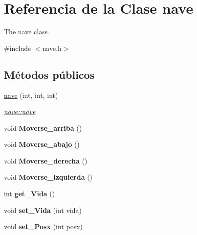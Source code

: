 \hypertarget{classnave}{\section{Referencia de la Clase nave}
\label{classnave}
}


The nave class.  




{\ttfamily \#include $<$nave.\+h$>$}

\subsection*{Métodos públicos}
\begin{DoxyCompactItemize}
\item 
\hyperlink{classnave_a8bacfc8f9a6084056d4225f019fec189}{nave} (int, int, int)
\begin{DoxyCompactList}\small\item\em \hyperlink{classnave_a8bacfc8f9a6084056d4225f019fec189}{nave\+::nave} \end{DoxyCompactList}\item 
\hypertarget{classnave_ab18b97fbf7a2754ef96f1dd2034fb3c3}{void {\bfseries Moverse\+\_\+arriba} ()}\label{classnave_ab18b97fbf7a2754ef96f1dd2034fb3c3}

\item 
\hypertarget{classnave_a20edce5f2a8c2ec2c20b5c9716c2106d}{void {\bfseries Moverse\+\_\+abajo} ()}\label{classnave_a20edce5f2a8c2ec2c20b5c9716c2106d}

\item 
\hypertarget{classnave_a8f3d73632fc16266855fd2cab2abd90e}{void {\bfseries Moverse\+\_\+derecha} ()}\label{classnave_a8f3d73632fc16266855fd2cab2abd90e}

\item 
\hypertarget{classnave_a2dcef95d2e45022b909466e53d8e7f23}{void {\bfseries Moverse\+\_\+izquierda} ()}\label{classnave_a2dcef95d2e45022b909466e53d8e7f23}

\item 
\hypertarget{classnave_a3243800568f85fc75ef3f82f35c52d44}{int {\bfseries get\+\_\+\+Vida} ()}\label{classnave_a3243800568f85fc75ef3f82f35c52d44}

\item 
\hypertarget{classnave_a6cae4804c09d2c101bf412bc290f61f7}{void {\bfseries set\+\_\+\+Vida} (int vida)}\label{classnave_a6cae4804c09d2c101bf412bc290f61f7}

\item 
\hypertarget{classnave_a1ebb327d302fd2f7aed03363d608b381}{void {\bfseries set\+\_\+\+Posx} (int posx)}\label{classnave_a1ebb327d302fd2f7aed03363d608b381}


\end{DoxyCompactItemize}
